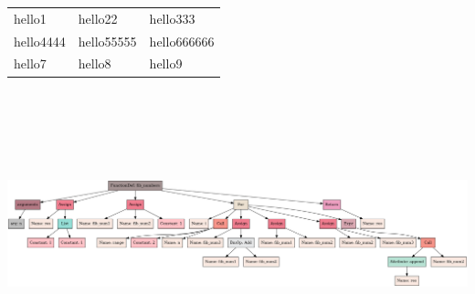 \documentclass{article}
\begin{document}
\begin{tabular}{lll}
hello1&hello22&hello333\\
hello4444&hello55555&hello666666\\
hello7&hello8&hello9
\end{tabular}\\\\\\\\\\
\includegraphics[width=\linewidth]{artifacts/fib_num_ast.png}
\end{document}
